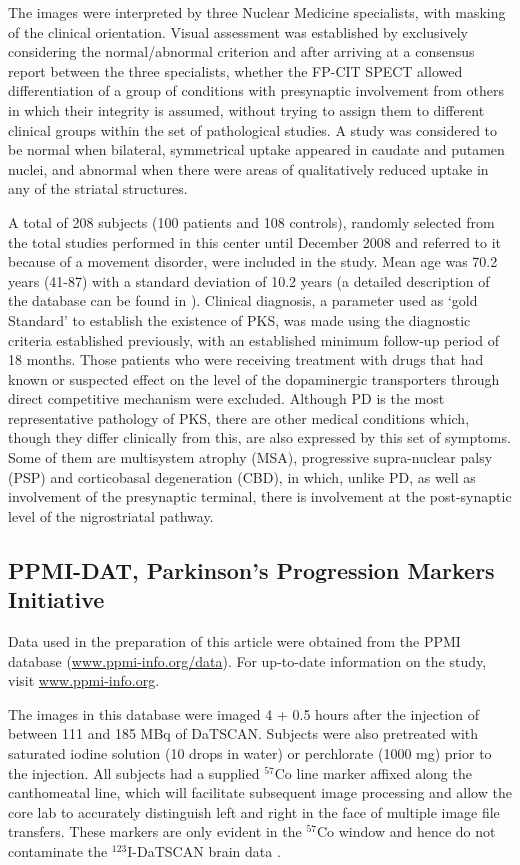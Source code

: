The images were interpreted by three Nuclear Medicine specialists, with masking of the clinical orientation. Visual assessment was established by exclusively considering the normal/abnormal criterion and after arriving at a consensus report between the three specialists, \ie whether the FP-CIT \ac{SPECT} allowed differentiation of a group of conditions with presynaptic involvement from others in which their integrity is assumed, without trying to assign them to different clinical groups within the set of pathological studies. A study was considered to be normal when bilateral, symmetrical uptake appeared in caudate and putamen nuclei, and abnormal when there were areas of qualitatively reduced uptake in any of the striatal structures. 

A total of 208 subjects (100 patients and 108 controls), randomly selected from the total studies performed in this center until December 2008 and referred to it because of a movement disorder, were included in the study. Mean age was 70.2 years (41-87) with a standard deviation of 10.2 years (a detailed description of the database can be found in \cite{Lozano2007}). Clinical diagnosis, a parameter used as `gold Standard' to establish the existence of \ac{PKS}, was made using the diagnostic criteria established previously, with an established minimum follow-up period of 18 months. Those patients who were receiving treatment with drugs that had known or suspected effect on the level of the dopaminergic transporters through direct competitive mechanism were excluded. Although \ac{PD} is the most representative pathology of \ac{PKS}, there are other medical conditions which, though they differ clinically from this, are also expressed by this set of symptoms. Some of them are multisystem atrophy (MSA), progressive supra-nuclear palsy (PSP) and corticobasal degeneration (CBD), in which, unlike \ac{PD}, as well as involvement of the presynaptic terminal, there is involvement at the post-synaptic level of the nigrostriatal pathway. 

\subsection{PPMI-DAT, Parkinson's Progression Markers Initiative}\label{sec:ppmi}
Data used in the preparation of this article were obtained from the \acf{PPMI} database (\url{www.ppmi-info.org/data}). For up-to-date information on the study, visit \url{www.ppmi-info.org}.

The images in this database were imaged 4 + 0.5 hours after the injection of between 111 and 185 MBq of DaTSCAN. Subjects were also pretreated with saturated iodine solution (10 drops in water) or perchlorate (1000 mg) prior to the injection. All subjects had a supplied $^{57}$Co line marker affixed along the canthomeatal line, which will facilitate subsequent image processing and allow the core lab to accurately distinguish left and right in the face of multiple image file transfers. These markers are only evident in the $^{57}$Co window and hence do not contaminate the $^{123}$I-DaTSCAN brain data \cite{PPMI,Inititative2010}. 

